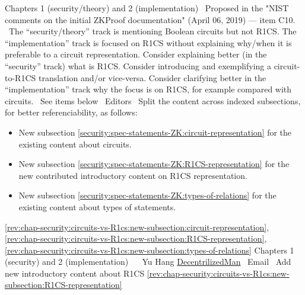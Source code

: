 \incItem[it:circuits-vs-R1CS]
Chapters 1 (security/theory) and 2 (implementation)
\newcol \ccontext\ Proposed in the "NIST comments on the initial ZKProof documentation" (April 06, 2019) --- item C10.
				\propContrib\ The ``security/theory'' track is mentioning Boolean circuits but not R1CS. The ``implementation'' track is focused on R1CS without explaining why/when it is preferable to a circuit representation. Consider explaining better (in the ``security'' track) what is R1CS. Consider introducing and exemplifying a circuit-to-R1CS translation and/or vice-versa. Consider clarifying better in the ``implementation'' track why the focus is on R1CS, for example compared with circuits.
\newcol {}
\newcol \Chan\ See items below
\newcol 
\rowendL
\newcol 
\newcol {}
\newcol \contributors\ Editors
				\Chan\ Split the content across indexed subsections, for better referenciability, as follows:
				\begin{itemize}
				\item New subsection \ref{security:spec-statements-ZK:circuit-representation} for the existing content about circuits. 
				\item New subsection \ref{security:spec-statements-ZK:R1CS-representation} for the new contributed introductory content on R1CS representation.
				\item New subsection \ref{security:spec-statements-ZK:types-of-relations} for the existing content about types of statements.
				\end{itemize}
\newcol \ref{rev:chap-security:circuits-vs-R1cs:new-subsection:circuit-representation}, \ref{rev:chap-security:circuits-vs-R1cs:new-subsection:R1CS-representation}, \ref{rev:chap-security:circuits-vs-R1cs:new-subsection:types-of-relations}
\rowendL
Chapters 1 (security) and 2 (implementation)
\newcol \propContrib\ 
\newcol {}
\newcol \contributors\ Yu Hang \href{https://github.com/DecentrilizedMan}{DecentrilizedMan}
				\submit\ Email
				\Chan\ Add new introductory content about R1CS
\newcol \ref{rev:chap-security:circuits-vs-R1cs:new-subsection:R1CS-representation}
\rowendL
\myendIssue



